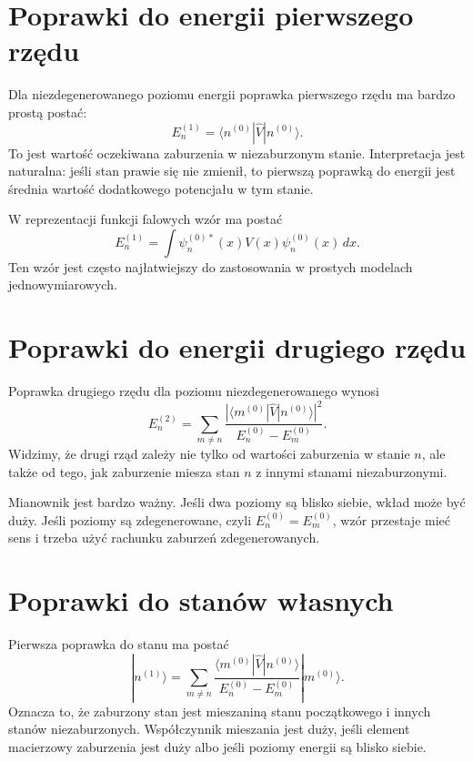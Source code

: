 \section{Poprawki do energii pierwszego rzędu}

Dla niezdegenerowanego poziomu energii poprawka pierwszego rzędu ma bardzo prostą postać:
\begin{equation}
    E_n^{(1)}=\langle n^{(0)}|\hat{V}|n^{(0)}\rangle.
\end{equation}
To jest wartość oczekiwana zaburzenia w niezaburzonym stanie. Interpretacja jest naturalna: jeśli stan prawie się nie zmienił, to pierwszą poprawką do energii jest średnia wartość dodatkowego potencjału w tym stanie.

W reprezentacji funkcji falowych wzór ma postać
\begin{equation}
    E_n^{(1)}=\int \psi_n^{(0)*}(x)V(x)\psi_n^{(0)}(x)\,dx.
\end{equation}
Ten wzór jest często najłatwiejszy do zastosowania w prostych modelach jednowymiarowych.

\section{Poprawki do energii drugiego rzędu}

Poprawka drugiego rzędu dla poziomu niezdegenerowanego wynosi
\begin{equation}
    E_n^{(2)}=\sum_{m\neq n}\frac{|\langle m^{(0)}|\hat{V}|n^{(0)}\rangle|^2}{E_n^{(0)}-E_m^{(0)}}.
\end{equation}
Widzimy, że drugi rząd zależy nie tylko od wartości zaburzenia w stanie \(n\), ale także od tego, jak zaburzenie miesza stan \(n\) z innymi stanami niezaburzonymi.

Mianownik jest bardzo ważny. Jeśli dwa poziomy są blisko siebie, wkład może być duży. Jeśli poziomy są zdegenerowane, czyli \(E_n^{(0)}=E_m^{(0)}\), wzór przestaje mieć sens i trzeba użyć rachunku zaburzeń zdegenerowanych.

\section{Poprawki do stanów własnych}

Pierwsza poprawka do stanu ma postać
\begin{equation}
    |n^{(1)}\rangle=\sum_{m\neq n}
    \frac{\langle m^{(0)}|\hat{V}|n^{(0)}\rangle}{E_n^{(0)}-E_m^{(0)}}|m^{(0)}\rangle.
\end{equation}
Oznacza to, że zaburzony stan jest mieszaniną stanu początkowego i innych stanów niezaburzonych. Współczynnik mieszania jest duży, jeśli element macierzowy zaburzenia jest duży albo jeśli poziomy energii są blisko siebie.

